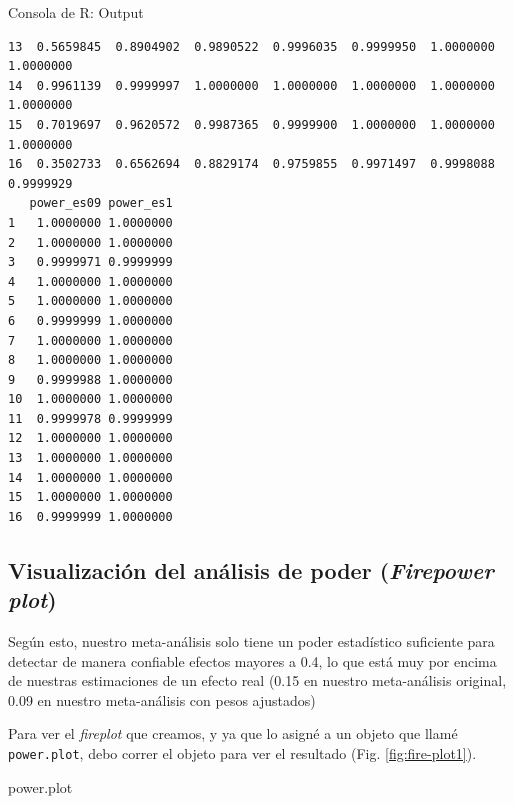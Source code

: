 \documentclass[
  bookmarksnumbered]{article}
\newenvironment{Shaded}{\begin{snugshade}}{\end{snugshade}}
\newcommand{\FunctionTok}[1]{\textcolor[rgb]{0.39,0.29,0.61}{#1}}
\newcommand{\NormalTok}[1]{\textcolor[rgb]{0.12,0.11,0.11}{#1}}
\newcommand{\OtherTok}[1]{\textcolor[rgb]{0.00,0.43,0.16}{#1}}
\newcommand{\SpecialCharTok}[1]{\textcolor[rgb]{0.24,0.68,0.91}{#1}}
\begin{document}
\begin{ROut}{Consola de R: Output~\thetcbcounter}
\begin{footnotesize}
\begin{verbatim}
13  0.5659845  0.8904902  0.9890522  0.9996035  0.9999950  1.0000000  1.0000000
14  0.9961139  0.9999997  1.0000000  1.0000000  1.0000000  1.0000000  1.0000000
15  0.7019697  0.9620572  0.9987365  0.9999900  1.0000000  1.0000000  1.0000000
16  0.3502733  0.6562694  0.8829174  0.9759855  0.9971497  0.9998088  0.9999929
   power_es09 power_es1
1   1.0000000 1.0000000
2   1.0000000 1.0000000
3   0.9999971 0.9999999
4   1.0000000 1.0000000
5   1.0000000 1.0000000
6   0.9999999 1.0000000
7   1.0000000 1.0000000
8   1.0000000 1.0000000
9   0.9999988 1.0000000
10  1.0000000 1.0000000
11  0.9999978 0.9999999
12  1.0000000 1.0000000
13  1.0000000 1.0000000
14  1.0000000 1.0000000
15  1.0000000 1.0000000
16  0.9999999 1.0000000
 \end{verbatim}
                \end{footnotesize}
                \end{ROut}

\hypertarget{visualizaciuxf3n-del-anuxe1lisis-de-poder-firepower-plot}{%
\subsection{\texorpdfstring{Visualización del análisis de poder (\emph{Firepower plot})}{Visualización del análisis de poder (Firepower plot)}}\label{visualizaciuxf3n-del-anuxe1lisis-de-poder-firepower-plot}}

Según esto, nuestro meta-análisis solo tiene un poder estadístico suficiente para detectar de manera confiable efectos mayores a 0.4, lo que está muy por encima de nuestras estimaciones de un efecto real (0.15 en nuestro meta-análisis original, 0.09 en nuestro meta-análisis con pesos ajustados)

\begin{Shaded}
\end{Shaded}

Para ver el \emph{fireplot} que creamos, y ya que lo asigné a un objeto que llamé \texttt{power.plot}, debo correr el objeto para ver el resultado (Fig. \ref{fig:fire-plot1}).

\begin{Shaded}
\begin{Highlighting}[]
\NormalTok{power.plot}
\end{Highlighting}
\end{Shaded}
\end{document}
